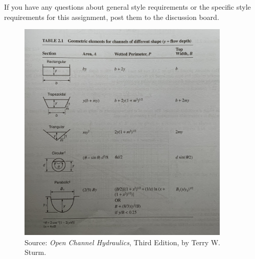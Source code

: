\documentclass{homework}
\begin{document}
If you have any questions about general style requirements or the specific style requirements for this assignment, post them to the discussion board.

\begin{figure}[h]
    \centering
    \includegraphics[width=0.9\textwidth]{sturm.jpg}
    \caption*{Source: \textit{Open Channel Hydraulics}, Third Edition, by Terry W. Sturm.}
\end{figure}





\end{document}
